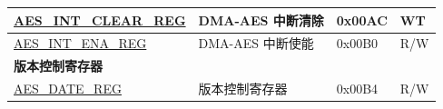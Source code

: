 \begin{longtable}{ | p{5.2cm} | p{6.6cm} | p{2cm} | p{1.2cm} | }
\hyperref[regdesc:AESINTCLEARREG]{AES\_INT\_CLEAR\_REG}		&	DMA-AES 中断清除	& 0x00AC & WT \\ \hline
\hyperref[regdesc:AESINTENAREG]{AES\_INT\_ENA\_REG}			&	DMA-AES 中断使能	& 0x00B0 & R/W \\ \hline

\multicolumn{4}{|l|}{\textbf{版本控制寄存器}} \\ \hline
\hyperref[regdesc:AESDATEREG]{AES\_DATE\_REG} & 版本控制寄存器 & 0x00B4 & R/W \\ \hline

\end{longtable}
